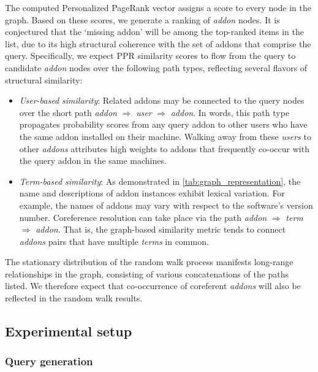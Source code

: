\documentclass[ijoc,nonblindrev]{informs3} %
\numberwithin{equation}{subsection}
\begin{document}
The computed Personalized PageRank vector assigns a score to every node in the graph. Based on these scores, we generate a ranking of {\it addon} nodes. It is conjectured that the `missing addon' will be among the top-ranked items in the list, due to its high structural coherence with the set of addons that comprise the query. Specifically, we expect PPR similarity scores to flow from the query to candidate {\it addon} nodes over the following path types, reflecting several flavors of structural similarity:
\begin{itemize}
\item {\it User-based similarity}: Related addons may be connected to the query nodes over the short path  {\it addon} $\Rightarrow$ {\it user}
   $\Rightarrow$ {\it addon}. In words, this path type propagates probability scores from any query addon to other users who have the same addon installed on their machine. Walking away from these {\it users} to other {\it addons} attributes high weights to addons that frequently co-occur with the query addon in the same machines. 
\item {\it Term-based similarity}: As demonstrated in \autoref{tab:graph_representation}, the name and descriptions of addon instances exhibit lexical variation. For example, the names of addons may vary with respect to the software's version number. Coreference resolution can take place via the path {\it addon} $\Rightarrow$ {\it term} $\Rightarrow$ {\it addon}. That is, the graph-based similarity metric tends to connect {\it addons} pairs that have multiple {\it terms} in common. 
\end{itemize}
The stationary distribution of the random walk process manifests long-range relationships in the graph, consisting of various concatenations of the paths listed. We therefore expect that co-occurrence of coreferent {\it addons} will also be reflected in the random walk results.

\subsection{Experimental setup}

\subsubsection{Query generation}
\end{document}
